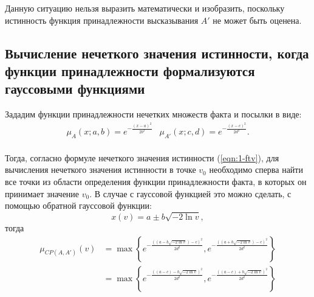 \begin{itemize}
Данную ситуацию нельзя выразить математически и изобразить, поскольку истинность функция принадлежности высказывания $A'$ не может быть оценена.
\end{itemize}

\subsection{Вычисление нечеткого значения истинности, когда функции принадлежности формализуются гауссовыми функциями}

Зададим функции принадлежности нечетких множеств факта и посылки в виде:
\begin{equation*}
\begin{aligned}
\mu_{A}(x; a, b) = e^{-\frac{(x-a)^2}{2b^2}} & \mu_{A'}(x; c, d) = e^{-\frac{(x-c)^2}{2d^2}}. \\
\end{aligned}
\end{equation*}

Тогда, согласно формуле нечеткого значения истинности (\ref{eqn:1-ftv}), для вычисления нечеткого значения истинности в точке $v_0$ необходимо сперва найти все точки из области определения функции принадлежности факта, в которых он принимает значение $v_0$. В случае с гауссовой функцией это можно сделать, с помощью обратной гауссовой функции:
\begin{equation*}
x(v) = a \pm b\sqrt{-2\ln{v}},
\end{equation*}
тогда
\begin{align}
\mu_{CP(A, A')}(v) &= \max\left\{e^{-\frac{((a - b\sqrt{-2\ln v})-c)^2}{2 d^2}},e^{-\frac{((a + b\sqrt{-2\ln v})-c)^2}{2 d^2}}\right\} \nonumber \\
&= \max\left\{e^{-\frac{((a-c) - b\sqrt{-2\ln v})^2}{2 d^2}},e^{-\frac{((a-c) + b\sqrt{-2\ln v})^2}{2 d^2}}\right\} \label{eqn:ftv-gauss-expanded}
\end{align}

%
%
%

